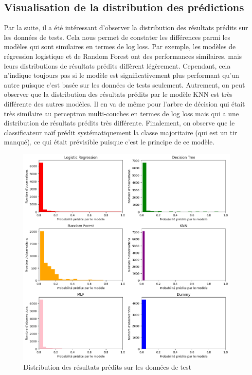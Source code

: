 \documentclass[12pt]{article}
\begin{document}
\subsection{Visualisation de la distribution des prédictions}
Par la suite, il a été intéressant d'observer la distribution des résultats prédits sur les données de tests.
Cela nous permet de constater les différences parmi les modèles qui sont similaires en termes de log loss.
Par exemple, les modèles de régression logistique et de Random Forest ont des performances similaires, mais leurs distributions de résultats prédits diffèrent légèrement.
Cependant, cela n'indique toujours pas si le modèle est significativement plus performant qu'un autre puisque c'est basée sur les données de tests seulement.
Autrement, on peut observer que la distribution des résultats prédits par le modèle KNN est très différente des autres modèles.
Il en va de même pour l'arbre de décision qui était très similaire au perceptron multi-couches en termes de log loss mais qui a une distribution de résultats prédits très différente.
\newline\newline
Finalement, on observe que le classificateur naïf prédit systématiquement la classe majoritaire (qui est un tir manqué), ce qui était prévisible puisque c'est le principe de ce modèle.
\begin{figure}[htp]
    \centering
    \includegraphics[width=\textwidth]{img/distributions_result_from_models.png}
    \caption{Distribution des résultats prédits sur les données de test}
    \label{fig:results}
\end{figure}
\end{document}
